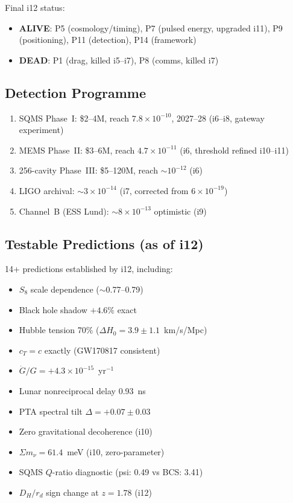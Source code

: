 \documentclass[11pt,a4paper]{article}
\begin{document}
\noindent Final i12 status:
\begin{itemize}[nosep]
\item \textbf{ALIVE}: P5 (cosmology/timing), P7 (pulsed energy, upgraded i11), P9 (positioning), P11 (detection), P14 (framework)
\item \textbf{DEAD}: P1 (drag, killed i5--i7), P8 (comms, killed i7)
\end{itemize}

\subsection{Detection Programme}

\begin{enumerate}[nosep]
\item SQMS Phase~I: \$2--4M, reach $7.8\times10^{-10}$, 2027--28 (i6--i8, gateway experiment)
\item MEMS Phase~II: \$3--6M, reach $4.7\times10^{-11}$ (i6, threshold refined i10--i11)
\item 256-cavity Phase~III: \$5--120M, reach $\sim10^{-12}$ (i6)
\item LIGO archival: $\sim3\times10^{-14}$ (i7, corrected from $6\times10^{-19}$)
\item Channel~B (ESS Lund): $\sim8\times10^{-13}$ optimistic (i9)
\end{enumerate}

\subsection{Testable Predictions (as of i12)}

14+ predictions established by i12, including:
\begin{itemize}[nosep]
\item $S_8$ scale dependence ($\sim$0.77--0.79)
\item Black hole shadow $+4.6\%$ exact
\item Hubble tension 70\% ($\Delta H_0=3.9\pm1.1$~km/s/Mpc)
\item $c_T=c$ exactly (GW170817 consistent)
\item $\dot{G}/G=+4.3\times10^{-15}$~yr$^{-1}$
\item Lunar nonreciprocal delay 0.93~ns
\item PTA spectral tilt $\Delta=+0.07\pm0.03$
\item Zero gravitational decoherence (i10)
\item $\Sigma m_\nu=61.4$~meV (i10, zero-parameter)
\item SQMS $Q$-ratio diagnostic (psi: 0.49 vs BCS: 3.41)
\item $D_H/r_d$ sign change at $z=1.78$ (i12)
\end{itemize}
\end{document}
